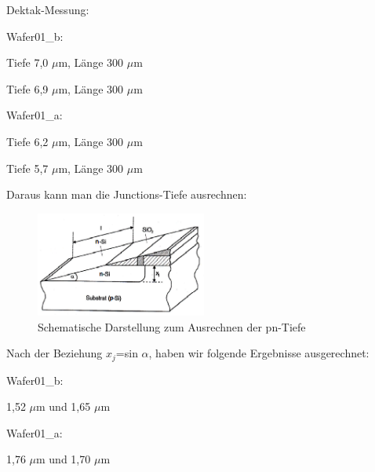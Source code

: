 Dektak-Messung:
\vspace{1mm}

    \hspace{15mm}       Wafer01\_b:
\vspace{1mm}
\begin{center}

Tiefe 7,0 $\mu$m, Länge 300 $\mu$m

Tiefe 6,9 $\mu$m, Länge 300 $\mu$m
\end{center}

    \hspace{15mm}        Wafer01\_a:

\vspace{1mm}
\begin{center}

    Tiefe 6,2 $\mu$m, Länge 300 $\mu$m

    Tiefe 5,7 $\mu$m, Länge 300 $\mu$m

\end{center}

Daraus kann man die Junctions-Tiefe ausrechnen:

\begin{figure}[htbp]
    \centering
        \includegraphics[width=0.5\textwidth]{bilder/SchematischeDarstellungzumAusrechnenderpnTiefe.png}
    \caption{Schematische Darstellung zum Ausrechnen der pn-Tiefe}
    \label{fig:SchematischeDarstellungzumAusrechnenderpnTiefe}
\end{figure}

Nach  der Beziehung $x_j$=sin $\alpha$, haben wir folgende Ergebnisse ausgerechnet:

\vspace{3mm}
    \hspace{15mm} Wafer01\_b:

\begin{center}
    1,52 $\mu$m und 1,65 $\mu$m
\end{center}

    \hspace{15mm}   Wafer01\_a:

\begin{center}
    1,76 $\mu$m und 1,70 $\mu$m
\end{center}

